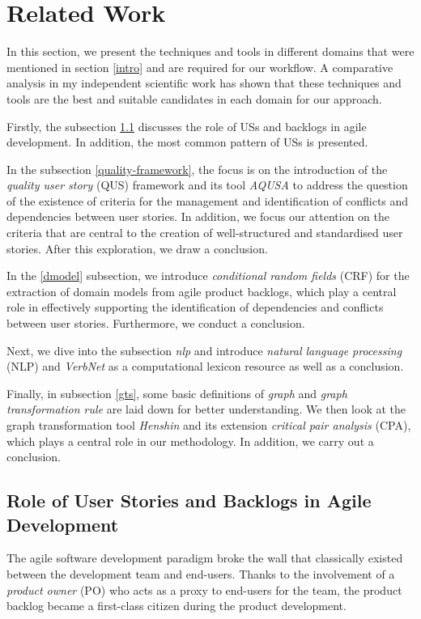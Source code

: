 \section{Related Work}\label{related-work}
In this section, we present the techniques and tools in different domains that were mentioned in section \ref{intro} and are required for our workflow. A comparative analysis in my independent scientific work \cite{nejad2023} has shown that these techniques and tools are the best and suitable candidates in each domain for our approach.

Firstly, the subsection \ref{us} discusses the role of USs and backlogs in agile development. In addition, the most common pattern of USs is presented. 

In the subsection \ref{quality-framework}, the focus is on the introduction of the \emph{quality user story} (QUS) framework and its tool \emph{AQUSA} to address the question of the existence of criteria for the management and identification of conflicts and dependencies between user stories. In addition, we focus our attention on the criteria that are central to the creation of well-structured and standardised user stories. After this exploration, we draw a conclusion.

In the \ref{dmodel} subsection, we introduce \emph{conditional random fields} (CRF) for the extraction of domain models from agile product backlogs, which play a central role in effectively supporting the identification of dependencies and conflicts between user stories. Furthermore, we conduct a conclusion.

Next, we dive into the subsection \emph{nlp} and introduce \emph{natural language processing} (NLP) and \emph{VerbNet} as a computational lexicon resource as well as a conclusion.

Finally, in subsection \ref{gts}, some basic definitions of \emph{graph} and \emph{graph transformation rule} are laid down for better understanding. We then look at the graph transformation tool \emph{Henshin} and its extension \emph{critical pair analysis} (CPA), which plays a central role in our methodology. In addition, we carry out a conclusion.

\subsection{Role of User Stories and Backlogs in Agile Development}\label{us}
The agile software development paradigm broke the wall that classically existed between the development team and end-users. Thanks to the involvement of a \emph{product owner} (PO) who acts as a proxy to end-users for the team, the product backlog \cite{sedano2019product} became a first-class citizen during the product development. 

